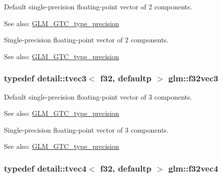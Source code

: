 Default single-precision floating-point vector of 2 components. \begin{Desc}
\item[See also:]\hyperlink{group__gtc__type__precision}{GLM\_\-GTC\_\-type\_\-precision}\end{Desc}
Single-precision floating-point vector of 2 components. \begin{Desc}
\item[See also:]\hyperlink{group__gtc__type__precision}{GLM\_\-GTC\_\-type\_\-precision} \end{Desc}
\hypertarget{group__gtc__type__precision_g9b74939fb3bdd450be65f798037dd79d}{
\subsubsection[f32vec3]{\setlength{\rightskip}{0pt plus 5cm}typedef detail::tvec3$<$ f32, defaultp $>$ {\bf glm::f32vec3}}}
\label{group__gtc__type__precision_g9b74939fb3bdd450be65f798037dd79d}


Default single-precision floating-point vector of 3 components. \begin{Desc}
\item[See also:]\hyperlink{group__gtc__type__precision}{GLM\_\-GTC\_\-type\_\-precision}\end{Desc}
Single-precision floating-point vector of 3 components. \begin{Desc}
\item[See also:]\hyperlink{group__gtc__type__precision}{GLM\_\-GTC\_\-type\_\-precision} \end{Desc}
\hypertarget{group__gtc__type__precision_gb6254ab9d409cce6579d7dc75dd34114}{
\subsubsection[f32vec4]{\setlength{\rightskip}{0pt plus 5cm}typedef detail::tvec4$<$ f32, defaultp $>$ {\bf glm::f32vec4}}}
\label{group__gtc__type__precision_gb6254ab9d409cce6579d7dc75dd34114}


